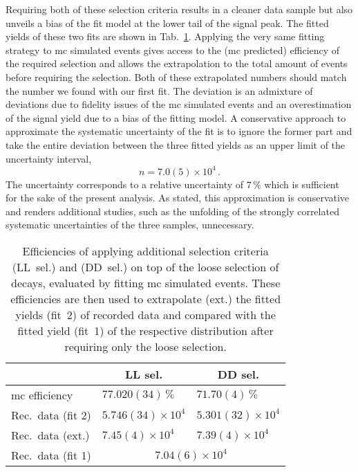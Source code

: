 Requiring both of these selection criteria results in a cleaner data sample but also unveils a bias of the fit model at the lower tail of the \Lb signal peak.
The fitted yields of these two fits are shown in Tab.~\ref{tab:LbToDzppi_xcheckN}.
Applying the very same fitting strategy to \gls{mc} simulated events gives access to the (\gls{mc} predicted) efficiency of the required selection and allows the extrapolation to the total amount of events before requiring the selection.
Both of these extrapolated numbers should match the number we found with our first fit.
The deviation is an admixture of deviations due to fidelity issues of the \gls{mc} simulated events and an overestimation of the signal yield due to a bias of the fitting model.
A conservative approach to approximate the systematic uncertainty of the fit is to ignore the former part and take the entire deviation between the three fitted yields as an upper limit of the uncertainty interval,
\begin{equation*}
    n = 7.0(5) \times 10^4 \,.
\end{equation*}
The uncertainty corresponds to a relative uncertainty of $7\,\%$ which is sufficient for the sake of the present analysis.
As stated, this approximation is conservative and renders additional studies, such as the unfolding of the strongly correlated systematic uncertainties of the three samples, unnecessary.
\begin{table}[htbp]
    \centering
    \caption{Efficiencies of applying additional selection criteria (\gls{LL}~sel.) and (\gls{DD}~sel.) on top of the loose selection of \decay{\Lb}{\Dz\proton\pim} decays, evaluated by fitting \gls{mc} simulated events. These efficiencies are then used to extrapolate (ext.) the fitted yields (fit~2) of recorded data and compared with the fitted yield (fit~1) of the respective distribution after requiring only the loose selection.}
    \label{tab:LbToDzppi_xcheckN}
    \begin{tabular}{lll}
        \toprule
        & \multicolumn{1}{c}{\gls{LL} sel.} & \multicolumn{1}{c}{\gls{DD} sel.} \\
        \midrule
        \gls{mc} efficiency & $77.020(34)\,\%$ & $71.70(4)\,\%$ \\
        Rec.\ data (fit 2) & $5.746(34) \times 10^4$ & $5.301(32) \times 10^4$ \\
        Rec.\ data (ext.) & $7.45(4) \times 10^4$ & $7.39(4) \times 10^4$ \\
        \midrule
        Rec.\ data (fit 1) & \multicolumn{2}{c}{{$7.04(6) \times 10^4$}} \\
        \bottomrule
    \end{tabular}
\end{table}

